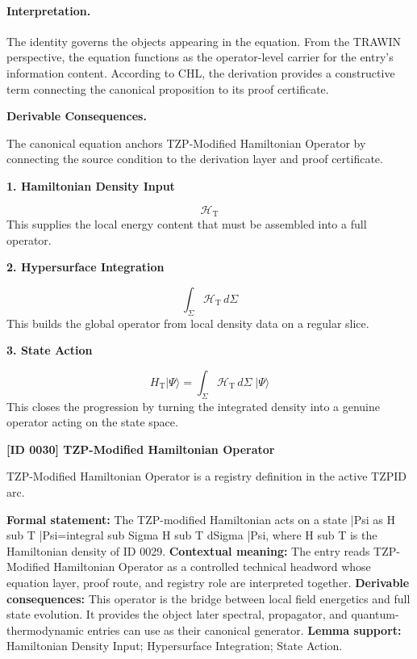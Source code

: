 \paragraph{Interpretation.}
The identity governs the objects appearing in the equation. From the TRAWIN perspective, the equation functions as the operator-level carrier for the entry’s information content. According to CHL, the derivation provides a constructive term connecting the canonical proposition to its proof certificate.

\par\vspace{0.35em}
\noindent\textbf{Derivable Consequences.}\quad
\begingroup
\footnotesize
\raggedright
The canonical equation anchors TZP-Modified Hamiltonian Operator by connecting the source condition to the derivation layer and proof certificate.
\par\endgroup

\noindent\textbf{1. Hamiltonian Density Input}\par
\[
\mathcal{H}_{\mathrm{T}}
\]
\noindent This supplies the local energy content that must be assembled into a full operator.\par
\noindent\textbf{2. Hypersurface Integration}\par
\[
\int_{\Sigma}\mathcal{H}_{\mathrm{T}}\,d\Sigma
\]
\noindent This builds the global operator from local density data on a regular slice.\par
\noindent\textbf{3. State Action}\par
\[
H_{\mathrm{T}}\lvert\Psi\rangle
=
\int_{\Sigma}\mathcal{H}_{\mathrm{T}}\,d\Sigma\;\lvert\Psi\rangle
\]
\noindent This closes the progression by turning the integrated density into a genuine operator acting on the state space.\par

\clearpage
\noindent\textbf{[ID 0030] TZP-Modified Hamiltonian Operator}\par
\vspace{0.35em}
\begingroup\small
{}
TZP-Modified Hamiltonian Operator is a registry definition in the active TZPID arc.

\begingroup\footnotesize\setlength{\emergencystretch}{3em}\sloppy
\textbf{Formal statement:} The TZP-modified Hamiltonian acts on a state |Psi as H sub T |Psi=integral sub Sigma H sub T dSigma |Psi, where H sub T is the Hamiltonian density of ID 0029. \textbf{Contextual meaning:} The entry reads TZP-Modified Hamiltonian Operator as a controlled technical headword whose equation layer, proof route, and registry role are interpreted together. \textbf{Derivable consequences:} This operator is the bridge between local field energetics and full state evolution. It provides the object later spectral, propagator, and quantum-thermodynamic entries can use as their canonical generator. \textbf{Lemma support:} Hamiltonian Density Input; Hypersurface Integration; State Action.\par
\endgroup

